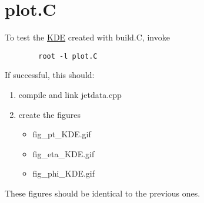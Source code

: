 \hypertarget{plot_8C-example}{
\section{plot.C}
}
To test the \hyperlink{classKDE}{KDE} created with build.C, invoke 

\footnotesize\begin{verbatim}        root -l plot.C
\end{verbatim}
\normalsize
If successful, this should: 

\begin{enumerate}
\item compile and link jetdata.cpp\item create the figures\begin{itemize}
\item fig\_\-pt\_\-KDE.gif\item fig\_\-eta\_\-KDE.gif\item fig\_\-phi\_\-KDE.gif \end{itemize}
\end{enumerate}


These figures should be identical to the previous ones.



